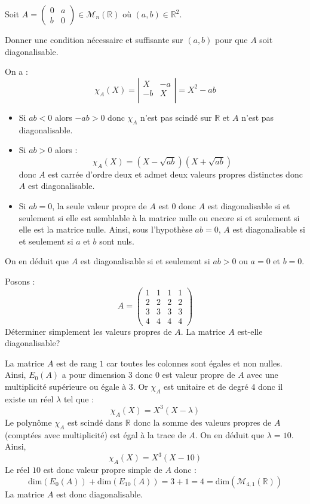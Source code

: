 \documentclass[a4paper,10pt]{report}
\begin{document}
\begin{Exercice}{} Soit $A= \begin{pmatrix}
0 & a \\
b & 0
\end{pmatrix} \in \mathcal{M}_n(\mathbb{R})$ où $(a,b) \in \mathbb{R}^2$. 

Donner une condition nécessaire et suffisante sur $(a,b)$ pour que $A$ soit diagonalisable.
\end{Exercice}

\corr On a :
$$ \chi_A(X) = \left\vert \begin{array}{cc}
X & -a \\
-b & X \\
\end{array}\right\vert = X^2-ab$$
\begin{itemize}
\item Si $ab<0$ alors $-ab>0$ donc $\chi_A$ n'est pas scindé sur $\mathbb{R}$ et $A$ n'est pas diagonalisable.
\item Si $ab>0$ alors :
$$ \chi_A(X) = (X- \sqrt{ab}) (X+ \sqrt{ab})$$
donc $A$ est carrée d'ordre deux et admet deux valeurs propres distinctes donc $A$ est diagonalisable.
\item Si $ab=0$, la seule valeur propre de $A$ est $0$ donc $A$ est diagonalisable si et seulement si elle est semblable à la matrice nulle ou encore si et seulement si elle est la matrice nulle. Ainsi, sous l'hypothèse $ab=0$, $A$ est diagonalisable si et seulement si $a$ et $b$ sont nuls.
\end{itemize}
On en déduit que $A$ est diagonalisable si et seulement si $ab>0$ ou $a=0$ et $b=0$.


\begin{Exercice}{} Posons :
    \[
    A =
    \begin{pmatrix}
      1 & 1 & 1 & 1 \\
      2 & 2 & 2 & 2 \\
      3 & 3 & 3 & 3 \\
      4 & 4 & 4 & 4
    \end{pmatrix}
    \]
Déterminer simplement les valeurs propres de $A$. La matrice $A$ est-elle diagonalisable?
\end{Exercice}

\corr La matrice $A$ est de rang $1$ car toutes les colonnes sont égales et non nulles. Ainsi, $E_0(A)$ a pour dimension $3$ donc $0$ est valeur propre de $A$ avec une multiplicité supérieure ou égale à $3$. Or $\chi_A$ est unitaire et de degré $4$ donc il existe un réel $\lambda$ tel que :
$$ \chi_A(X) = X^3(X-\lambda)$$
Le polynôme $\chi_A$ est scindé dans $\mathbb{R}$ donc la somme des valeurs propres de $A$ (comptées avec multiplicité) est égal à la trace de $A$. On en déduit que $\lambda = 10$. Ainsi,
$$ \chi_A(X)=X^3(X- 10)$$
Le réel $10$ est donc valeur propre simple de $A$ donc :
$$ \textrm{dim}(E_0(A))+ \textrm{dim}(E_{10}(A)) = 3+1 = 4 = \textrm{dim}(\mathcal{M}_{4,1}(\mathbb{R}))$$
La matrice $A$ est donc diagonalisable.
\end{document}
